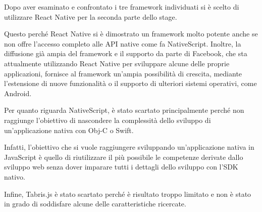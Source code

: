 Dopo aver esaminato e confrontato i tre framework individuati si è scelto di utilizzare React Native per la seconda parte dello stage.

Questo perché React Native si è dimostrato un framework molto potente anche se non offre l'accesso completo alle API native come fa NativeScript.
Inoltre, la diffusione già ampia del framework e il supporto da parte di Facebook, che sta attualmente utilizzando React Native per sviluppare alcune delle proprie applicazioni, fornisce al framework un'ampia possibilità di crescita, mediante l'estensione di nuove funzionalità o il supporto di ulteriori sistemi operativi, come Android.

Per quanto riguarda NativeScript, è stato scartato principalmente perché non raggiunge l'obiettivo di nascondere la complessità dello sviluppo di un'applicazione nativa con Obj-C o Swift.

Infatti, l'obiettivo che si vuole raggiungere sviluppando un'applicazione nativa in JavaScript è quello di riutilizzare il più possibile le competenze derivate dallo sviluppo web senza dover imparare tutti i dettagli dello sviluppo con l'SDK nativo.

Infine, Tabris.js è stato scartato perché è risultato troppo limitato e non è stato in grado di soddisfare alcune delle caratteristiche ricercate.




